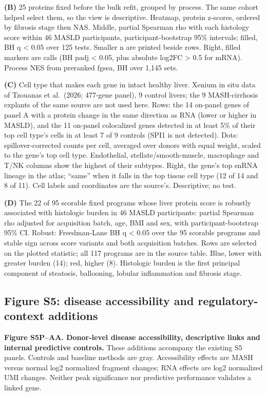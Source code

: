 \textbf{(B)} 25 proteins fixed before the bulk refit, grouped by process. The same cohort helped select them, so the view is descriptive. Heatmap, protein z-scores, ordered by fibrosis stage then NAS. Middle, partial Spearman rho with each histology score within 46 MASLD participants, participant-bootstrap 95\% intervals; filled, BH q \textless{} 0.05 over 125 tests. Smaller n are printed beside rows. Right, filled markers are calls (BH padj \textless{} 0.05, plus absolute log2FC \textgreater{} 0.5 for mRNA). Process NES from preranked fgsea, BH over 1,145 sets.

\textbf{(C)} Cell type that makes each gene in intact healthy liver. Xenium in situ data of Tzouanas et al.~(2026; 477-gene panel), 9 control livers; the 9 MASH-cirrhosis explants of the same source are not used here. Rows: the 14 on-panel genes of panel A with a protein change in the same direction as RNA (lower or higher in MASLD), and the 11 on-panel colocalized genes detected in at least 5\% of their top cell type's cells in at least 7 of 9 controls (SPI1 is not detected). Dots: spillover-corrected counts per cell, averaged over donors with equal weight, scaled to the gene's top cell type. Endothelial, stellate/smooth-muscle, macrophage and T/NK columns show the highest of their subtypes. Right, the gene's top snRNA lineage in the atlas; ``same'' when it falls in the top tissue cell type (12 of 14 and 8 of 11). Cell labels and coordinates are the source's. Descriptive; no test.

\textbf{(D)} The 22 of 95 scorable fixed programs whose liver protein score is robustly associated with histologic burden in 46 MASLD participants: partial Spearman rho adjusted for acquisition batch, age, BMI and sex, with participant-bootstrap 95\% CI. Robust: Freedman-Lane BH q \textless{} 0.05 over the 95 scorable programs and stable sign across score variants and both acquisition batches. Rows are selected on the plotted statistic; all 117 programs are in the source table. Blue, lower with greater burden (14); red, higher (8). Histologic burden is the first principal component of steatosis, ballooning, lobular inflammation and fibrosis stage.

\subsection{Figure S5: disease accessibility and regulatory-context additions}\label{figure-s5-disease-accessibility-and-regulatory-context-additions}

\textbf{Figure S5P--AA. Donor-level disease accessibility, descriptive links and internal predictive controls.} These additions accompany the existing S5 panels. Controls and baseline methods are gray. Accessibility effects are MASH versus normal log2 normalized fragment changes; RNA effects are log2 normalized UMI changes. Neither peak significance nor predictive performance validates a linked gene.

